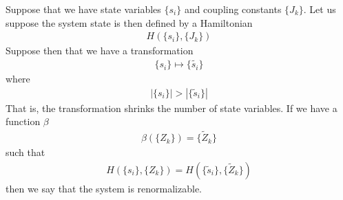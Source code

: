 \documentclass[book.tex]{subfiles}
\begin{document}
Suppose that we have state variables $\{s_i\}$ and coupling constants $\{J_k\}$. Let us suppose the system state is then defined by a Hamiltonian
\begin{align}
    H(\{s_i\}, \{J_k\})
\end{align}
Suppose then that we have a transformation
\begin{align}
    \{s_i\} \mapsto \{\tilde{s_i}\}
\end{align}
where 
\begin{align}
    |\{s_i\}| > |\{\tilde{s}_i\}|
\end{align}
That is, the transformation shrinks the number of state variables. If we have a function $\beta$
\begin{align}
    \beta(\{Z_k\}) = \{\tilde{Z}_k\}
\end{align}
such that
\begin{align}
    H(\{s_i\}, \{Z_k\}) = H(\{\tilde{s}_i\}, \{\tilde{Z}_k\})
\end{align}
then we say that the system is renormalizable.
\end{document}
